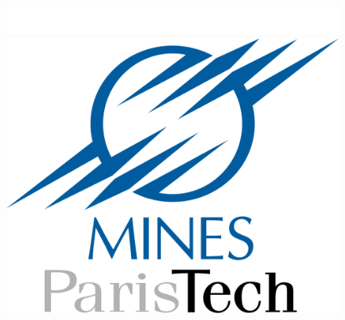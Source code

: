 \documentclass[a4paper,10pt,twocolumn]{article}
\begin{document}
\begin{titlepage}










\begin{flushright}
  \begin{figure}[!ht]
  \includegraphics[width=\linewidth]{white.png}
\endminipage
{}
  \includegraphics[width=\linewidth]{Mines_ParisTech.png}
\endminipage\hfill
{}

\end{figure}
\end{flushright}
\end{titlepage}
\end{document}
